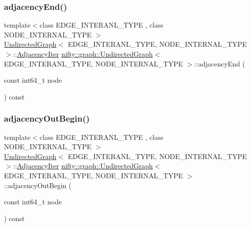 \subsubsection{\texorpdfstring{adjacency\+End()}{adjacencyEnd()}}
{\footnotesize\ttfamily template$<$class E\+D\+G\+E\+\_\+\+I\+N\+T\+E\+R\+A\+N\+L\+\_\+\+T\+Y\+PE , class N\+O\+D\+E\+\_\+\+I\+N\+T\+E\+R\+N\+A\+L\+\_\+\+T\+Y\+PE $>$ \\
\hyperlink{classnifty_1_1graph_1_1UndirectedGraph}{Undirected\+Graph}$<$ E\+D\+G\+E\+\_\+\+I\+N\+T\+E\+R\+A\+N\+L\+\_\+\+T\+Y\+PE, N\+O\+D\+E\+\_\+\+I\+N\+T\+E\+R\+N\+A\+L\+\_\+\+T\+Y\+PE $>$\+::\hyperlink{classnifty_1_1graph_1_1UndirectedGraph_adecb4597d23d097b08c2c03a106bc57b}{Adjacency\+Iter} \hyperlink{classnifty_1_1graph_1_1UndirectedGraph}{nifty\+::graph\+::\+Undirected\+Graph}$<$ E\+D\+G\+E\+\_\+\+I\+N\+T\+E\+R\+A\+N\+L\+\_\+\+T\+Y\+PE, N\+O\+D\+E\+\_\+\+I\+N\+T\+E\+R\+N\+A\+L\+\_\+\+T\+Y\+PE $>$\+::adjacency\+End (\begin{DoxyParamCaption}\item[{const int64\+\_\+t}]{node }\end{DoxyParamCaption}) const}

\mbox{\label{classnifty_1_1graph_1_1UndirectedGraph_aeb650cb1aa92c762db247e336c35f352}} 
\subsubsection{\texorpdfstring{adjacency\+Out\+Begin()}{adjacencyOutBegin()}}
{\footnotesize\ttfamily template$<$class E\+D\+G\+E\+\_\+\+I\+N\+T\+E\+R\+A\+N\+L\+\_\+\+T\+Y\+PE , class N\+O\+D\+E\+\_\+\+I\+N\+T\+E\+R\+N\+A\+L\+\_\+\+T\+Y\+PE $>$ \\
\hyperlink{classnifty_1_1graph_1_1UndirectedGraph}{Undirected\+Graph}$<$ E\+D\+G\+E\+\_\+\+I\+N\+T\+E\+R\+A\+N\+L\+\_\+\+T\+Y\+PE, N\+O\+D\+E\+\_\+\+I\+N\+T\+E\+R\+N\+A\+L\+\_\+\+T\+Y\+PE $>$\+::\hyperlink{classnifty_1_1graph_1_1UndirectedGraph_adecb4597d23d097b08c2c03a106bc57b}{Adjacency\+Iter} \hyperlink{classnifty_1_1graph_1_1UndirectedGraph}{nifty\+::graph\+::\+Undirected\+Graph}$<$ E\+D\+G\+E\+\_\+\+I\+N\+T\+E\+R\+A\+N\+L\+\_\+\+T\+Y\+PE, N\+O\+D\+E\+\_\+\+I\+N\+T\+E\+R\+N\+A\+L\+\_\+\+T\+Y\+PE $>$\+::adjacency\+Out\+Begin (\begin{DoxyParamCaption}\item[{const int64\+\_\+t}]{node }\end{DoxyParamCaption}) const}

